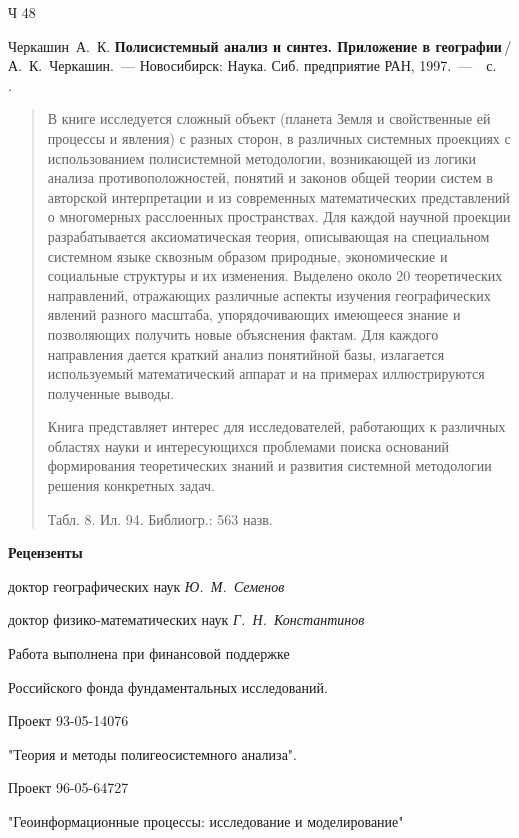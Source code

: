 \documentclass[draft,openany,14pt]{extbook}
\begin{document}
\noindent{}\begin{minipage}[t]{3em}
\noindent{}Ч 48%
\end{minipage}\hfill{}%
\begin{minipage}[t]{0.90\linewidth}
\setlength{\parindent}{3.5ex}

Черкашин~А.~К. {\bfseries Полисистемный анализ и синтез. Приложение в географии}\,{}/
А.~К.~Черкашин.~--- Новосибирск: Наука. Сиб. предприятие
РАН, 1997.~---~\pageref{LastPage}~с.\\[0.3em]
\ISBN{}.
\vspace{1em}

\begin{abstract}\small
В книге исследуется сложный объект (планета Земля и свойственные ей процессы и явления) с разных сторон, в различных системных проекциях с использованием полисистемной методологии, возникающей из логики анализа противоположностей, понятий и законов общей теории систем в авторской интерпретации и из современных математических представлений о многомерных расслоенных пространствах. Для каждой научной проекции разрабатывается аксиоматическая теория, описывающая на специальном системном языке сквозным образом природные, экономические и социальные структуры и их изменения. Выделено около 20 теоретических направлений, отражающих различные аспекты изучения географических явлений разного масштаба, упорядочивающих имеющееся знание и позволяющих получить новые объяснения фактам. Для каждого направления дается краткий анализ понятийной базы, излагается используемый математический аппарат и на примерах иллюстрируются полученные выводы.

Книга представляет интерес для исследователей, работающих к различных областях науки и интересующихся проблемами поиска оснований формирования теоретических знаний и развития системной методологии решения конкретных задач.

Табл. 8. Ил. 94. Библиогр.: 563 назв.
\end{abstract}

\vspace{2em}
\centering
\textbf{Рецензенты}

доктор географических наук \textit{Ю.~М.~Семенов}

доктор физико-математических наук \textit{Г.~Н.~Константинов}
\vspace{1ex}

Работа выполнена при финансовой поддержке

Российского фонда фундаментальных исследований.

Проект 93-05-14076

"Теория и методы полигеосистемного анализа".

Проект 96-05-64727

"Геоинформационные процессы: исследование и моделирование"
\end{minipage}
\end{document}
